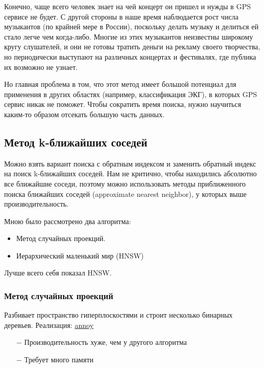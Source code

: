 Конечно, чаще всего человек знает на чей концерт он пришел и нужды в GPS сервисе не будет.
С другой стороны в наше время наблюдается рост числа музыкантов (по крайней мере в России),
поскольку делать музыку и делиться ей стало легче чем когда-либо.
Многие из этих музыкантов неизвестны широкому кругу слушателей, и они не готовы тратить
деньги на рекламу своего творчества, но периодически выступают на различных концертах
и фестивалях, где публика их возможно не узнает.

Но главная проблема в том, что этот метод имеет большой потенциал для применения
в других областях (например, классификация ЭКГ), в которых GPS сервис никак не поможет.
Чтобы сократить время поиска, нужно научиться каким-то образом отсекать большую часть данных.

\subsection{Метод k-ближайших соседей}
Можно взять вариант поиска с обратным индексом и заменить обратный индекс на
поиск k-ближайших соседей. Нам не критично, чтобы находились абсолютно все ближайшие соседи,
поэтому можно использовать методы приближенного поиска ближайших соседей
(approximate nearest neighbor), у которых выше производительность.

Мною было рассмотрено два алгоритма:
\begin{itemize}
    \item Метод случайных проекций.
    \item Иерархический маленький мир (HNSW)
\end{itemize}

Лучше всего себя показал HNSW.

\subsubsection{Метод случайных проекций}
Разбивает пространство гиперплоскостями и строит несколько бинарных деревьев.
Реализация: \href{https://github.com/spotify/annoy}{annoy}
\begin{itemize}
    \item[$-$] Производительность хуже, чем у другого алгоритма
    \item[$-$] Требует много памяти
\end{itemize}

